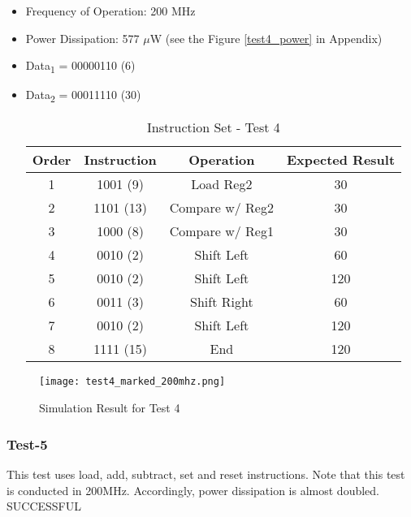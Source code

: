 \documentclass[12pt]{article}
\begin{document}
\begin{itemize}
\item Frequency of Operation: 200 MHz
\item Power Dissipation: 577 $\mu$W (see the Figure \ref{test4_power} in Appendix)
\item Data\textsubscript{1} = 00000110 (6) 
\item Data\textsubscript{2} = 00011110 (30) 
\begin{table}[h]
\centering
\begin{tabular}{|c|c|c|c|}
\hline 
Order & Instruction & Operation & Expected Result \\ 
\hline 
1 & 1001 (9) & Load Reg2 & 30 \\ 
\hline 
2 & 1101 (13) & Compare w/ Reg2 & 30 \\ 
\hline 
3 & 1000 (8) & Compare w/ Reg1 & 30 \\ 
\hline 
4 & 0010 (2) & Shift Left & 60 \\ 
\hline 
5 & 0010 (2) & Shift Left & 120 \\ 
\hline 
6 & 0011 (3) & Shift Right & 60 \\ 
\hline 
7 & 0010 (2) & Shift Left & 120 \\ 
\hline 
8 & 1111 (15) & End & 120 \\ 
\hline 
\end{tabular} 
\caption{Instruction Set - Test 4}
\end{table}
\end{itemize}


\begin{figure}[H]
\centering
\texttt{[image: test4\_marked\_200mhz.png]}
\caption{Simulation Result for Test 4}
\label{test4}
\end{figure}





\subsubsection*{Test-5} %
This test uses load, add, subtract, set and reset instructions. Note that this test is conducted in 200MHz. Accordingly, power dissipation is almost doubled.  \color{Green} SUCCESSFUL \color{Black}
\end{document}
